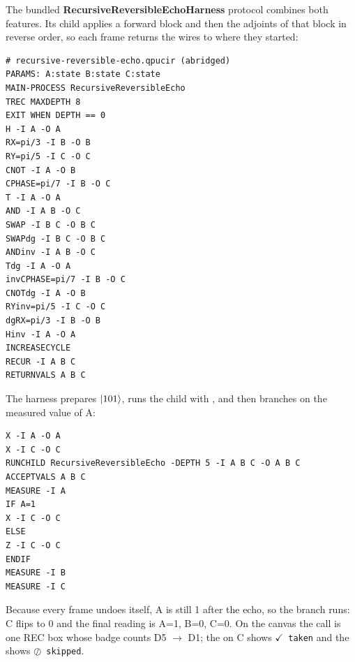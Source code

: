 The bundled \textbf{RecursiveReversibleEchoHarness} protocol combines both
features. Its child applies a forward block and then the adjoints of that block
in reverse order, so each frame returns the wires to where they started:
\begin{lstlisting}
# recursive-reversible-echo.qpucir (abridged)
PARAMS: A:state B:state C:state
MAIN-PROCESS RecursiveReversibleEcho
TREC MAXDEPTH 8
EXIT WHEN DEPTH == 0
H -I A -O A
RX=pi/3 -I B -O B
RY=pi/5 -I C -O C
CNOT -I A -O B
CPHASE=pi/7 -I B -O C
T -I A -O A
AND -I A B -O C
SWAP -I B C -O B C
SWAPdg -I B C -O B C
ANDinv -I A B -O C
Tdg -I A -O A
invCPHASE=pi/7 -I B -O C
CNOTdg -I A -O B
RYinv=pi/5 -I C -O C
dgRX=pi/3 -I B -O B
Hinv -I A -O A
INCREASECYCLE
RECUR -I A B C
RETURNVALS A B C
\end{lstlisting}
The harness prepares $\lvert 101\rangle$, runs the child with , and then
branches on the measured value of A:
\begin{lstlisting}
X -I A -O A
X -I C -O C
RUNCHILD RecursiveReversibleEcho -DEPTH 5 -I A B C -O A B C
ACCEPTVALS A B C
MEASURE -I A
IF A=1
X -I C -O C
ELSE
Z -I C -O C
ENDIF
MEASURE -I B
MEASURE -I C
\end{lstlisting}
Because every frame undoes itself, A is still 1 after the echo, so the
 branch runs: C flips to 0 and the final reading is A=1, B=0, C=0.
On the canvas the call is one REC box whose badge counts D5 $\rightarrow$ D1; the
 on C shows \texttt{$\checkmark$ taken} and the  shows
\texttt{$\oslash$ skipped}.

